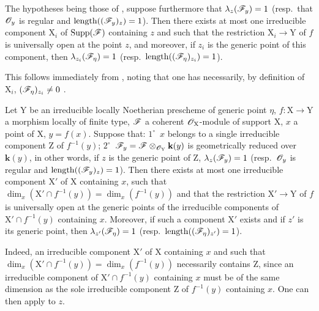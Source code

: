 \begin{corollary}[15.1.2]
\label{IV.15.1.2}
The hypotheses being those of , suppose furthermore that $\lambda_z(\mathscr{F}_y)=1$ (resp.~that $\mathscr{O}_y$ is regular and $\operatorname{length}((\mathscr{F}_y)_z)=1$).
Then there exists at most one irreducible component $\mathrm{X}_i$ of $\operatorname{Supp}(\mathscr{F})$ containing $z$ and such that the restriction $\mathrm{X}_i\to\mathrm{Y}$ of $f$ is universally open at the point $z$, and moreover, if $z_i$ is the generic point of this component, then $\lambda_{z_i}(\mathscr{F}_\eta)=1$ (resp.~$\operatorname{length}((\mathscr{F}_\eta)_{z_i})=1$).
\end{corollary}

This follows immediately from , noting that one has necessarily, by definition of $\mathrm{X}_i$, $(\mathscr{F}_\eta)_{z_i}\neq 0$ .

\begin{corollary}[15.1.3]
\label{IV.15.1.3}
Let $\mathrm{Y}$ be an irreducible locally Noetherian prescheme of generic point $\eta$, $f:\mathrm{X}\to\mathrm{Y}$ a morphism locally of finite type, $\mathscr{F}$ a coherent $\mathscr{O}_\mathrm{X}$-module of support $\mathrm{X}$, $x$ a point of $\mathrm{X}$, $y=f(x)$.
Suppose that: $1^\circ$~$x$ belongs to a single irreducible component $\mathrm{Z}$ of $f^{-1}(y)$; $2^\circ$~$\mathscr{F}_y=\mathscr{F}\otimes_{\mathscr{O}_\mathrm{Y}}\mathbf{k}(y)$ is geometrically reduced over $\mathbf{k}(y)$, in other words, if $z$ is the generic point of $\mathrm{Z}$, $\lambda_z(\mathscr{F}_y)=1$ (resp.~$\mathscr{O}_y$ is regular and $\operatorname{length}((\mathscr{F}_y)_z)=1$).
Then there exists at most one irreducible component $\mathrm{X}'$ of $\mathrm{X}$ containing $x$, such that $\dim_x(\mathrm{X}'\cap f^{-1}(y))=\dim_x(f^{-1}(y))$ and that the restriction $\mathrm{X}'\to\mathrm{Y}$ of $f$ is universally open at the generic points of the irreducible components of $\mathrm{X}'\cap f^{-1}(y)$ containing $x$.
Moreover, if such a component $\mathrm{X}'$ exists and if $z'$ is its generic point, then $\lambda_{z'}(\mathscr{F}_\eta)=1$ (resp.~$\operatorname{length}((\mathscr{F}_\eta)_{z'})=1$).
\end{corollary}

Indeed, an irreducible component $\mathrm{X}'$ of $\mathrm{X}$ containing $x$ and such that $\dim_x(\mathrm{X}'\cap f^{-1}(y))=\dim_x(f^{-1}(y))$ necessarily contains $\mathrm{Z}$, since an irreducible component of $\mathrm{X}'\cap f^{-1}(y)$ containing $x$ must be of the same dimension as the sole irreducible component $\mathrm{Z}$ of $f^{-1}(y)$ containing $x$.
One can then apply  to $z$.

